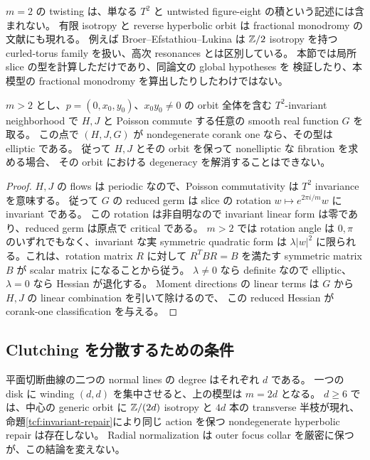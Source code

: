 $m=2$ の twisting は、単なる $T^2$ と untwisted figure-eight の積という記述には含まれない。
有限 isotropy と reverse hyperbolic orbit は fractional monodromy の文献にも現れる。
例えば Broer--Efstathiou--Lukina \cite[Section 2.1, Remark 2]{bel-fractional-tcf} は
$\mathbb Z/2$ isotropy を持つ curled-torus family を扱い、高次 resonances とは区別している。
本節では局所 slice の型を計算しただけであり、同論文の global hypotheses を
検証したり、本模型の fractional monodromy を算出したりしたわけではない。

\begin{proposition}
\label{tcf:invariant-repair}
$m>2$ とし、$p=(0,x_0,y_0)$、$x_0y_0\ne0$ の orbit 全体を含む
$T^2$-invariant neighborhood で
$H,J$ と Poisson commute する任意の smooth real function $G$ を取る。
この点で $(H,J,G)$ が nondegenerate corank one なら、その型は elliptic である。
従って $H,J$ とその orbit を保って nonelliptic な fibration を求める場合、
その orbit における degeneracy を解消することはできない。
\end{proposition}

\begin{proof}
$H,J$ の flows は periodic なので、Poisson commutativity は $T^2$ invariance を意味する。
従って $G$ の reduced germ は slice の rotation $w\mapsto e^{2\pi i/m}w$ に invariant である。
この rotation は非自明なので invariant linear form は零であり、reduced germ は原点で critical である。
$m>2$ では rotation angle は $0,\pi$ のいずれでもなく、invariant な実 symmetric quadratic form は
$\lambda|w|^2$ に限られる。これは、rotation matrix $R$ に対して
$R^TBR=B$ を満たす symmetric matrix $B$ が scalar matrix になることから従う。
$\lambda\ne0$ なら definite なので elliptic、$\lambda=0$ なら Hessian が退化する。
Moment directions の linear terms は $G$ から $H,J$ の linear combination を引いて除けるので、
この reduced Hessian が corank-one classification を与える。
\end{proof}

\subsection{Clutching を分散するための条件}

平面切断曲線の二つの normal lines の degree はそれぞれ $d$ である。
一つの disk に winding $(d,d)$ を集中させると、上の模型は $m=2d$ となる。
$d\ge6$ では、中心の generic orbit に $\mathbb Z/(2d)$ isotropy と $4d$ 本の transverse 半枝が現れ、
命題\ref{tcf:invariant-repair}により同じ action を保つ nondegenerate hyperbolic repair は存在しない。
Radial normalization は outer focus collar を厳密に保つが、この結論を変えない。

